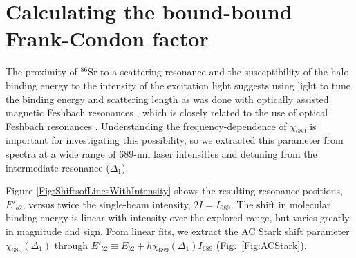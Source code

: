 \section{Calculating the bound-bound Frank-Condon factor}
\label{sec:lowE_coupling}

The proximity of $^{86}$Sr to a scattering resonance and the susceptibility of the halo binding energy to the intensity of the excitation light suggests  using light to tune the binding energy and scattering length as was done with optically assisted magnetic Feshbach resonances \cite{blv09,chx15}, which is closely related to the use of optical Feshbach resonances \cite{Fedichev1996a,Theis2004,Yamazaki2010,Blatt,Yan2013c}. Understanding the frequency-dependence of $\chi_{689}$ is important for investigating this possibility, so we extracted this parameter from spectra at a wide range of 689-nm laser intensities and detuning from the intermediate resonance ($\Delta_1$).

Figure \ref{Fig:ShiftsofLinesWithIntensity} shows
the resulting resonance positions, $E'_{b2}$, versus twice the single-beam intensity, $2I=I_{689}$. The shift in molecular binding energy is linear with intensity over the explored range, but varies greatly in magnitude and sign. From linear fits, we extract the AC Stark shift parameter $\chi_{689}(\Delta_1)$ through $E'_{b2}\equiv E_{b2}+h\chi_{689}(\Delta_{1}) I_{689}$ (Fig.\ \ref{Fig:ACStark}).


